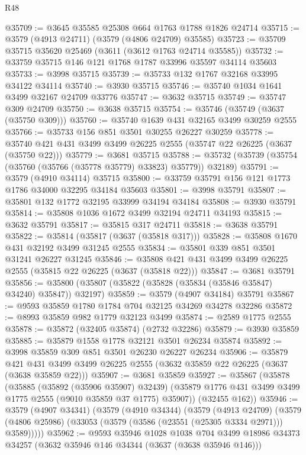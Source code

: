 \begin{lexlean}{R48}
\begin{coremodule}
@35709 := @3645 @35585 @25308 @664 @1763 @1788 @1826 @24714
@35715 := @3579 (@4913 @24711) (@3579 (@4806 @24709) @35585)
@35723 := @35709 @35715 @35620 @25469 (@3611 (@3612 @1763 @24714 @35585))
@35732 := @33759 @35715 @146 @121 @1768 @1787 @33996 @35597 @34114 @35603
@35733 := @3998 @35715
@35739 := @35733 @132 @1767 @32168 @33995 @34122 @34114
@35740 := @3930 @35715
@35746 := @35740 @1034 @1641 @3499 @32167 @24709 @33776
@35747 := @3632 @35715
@35749 := @35747 @309 @24709
@35750 := @3638 @35715
@35754 := @35746 (@35749 (@3637 (@35750 @309)))
@35760 := @35740 @1639 @431 @32165 @3499 @30259 @2555
@35766 := @35733 @156 @851 @3501 @30255 @26227 @30259
@35778 := @35740 @421 @431 @3499 @3499 @26225 @2555 (@35747 @22 @26225 (@3637 (@35750 @22)))
@35779 := @3681 @35715
@35788 := @35732 (@35739 (@35754 (@35760 (@35766 (@35778 @35779) @33823) @35779)) @32189)
@35791 := @3579 (@4910 @34114) @35715
@35800 := @33759 @35791 @156 @121 @1773 @1786 @34000 @32295 @34184 @35603
@35801 := @3998 @35791
@35807 := @35801 @132 @1772 @32195 @33999 @34194 @34184
@35808 := @3930 @35791
@35814 := @35808 @1036 @1672 @3499 @32194 @24711 @34193
@35815 := @3632 @35791
@35817 := @35815 @317 @24711
@35818 := @3638 @35791
@35822 := @35814 (@35817 (@3637 (@35818 @317)))
@35828 := @35808 @1670 @431 @32192 @3499 @31245 @2555
@35834 := @35801 @339 @851 @3501 @31241 @26227 @31245
@35846 := @35808 @421 @431 @3499 @3499 @26225 @2555 (@35815 @22 @26225 (@3637 (@35818 @22)))
@35847 := @3681 @35791
@35856 := @35800 (@35807 (@35822 (@35828 (@35834 (@35846 @35847) @34240) @35847)) @32197)
@35859 := @3579 (@4907 @34184) @35791
@35867 := @9593 @35859 @1780 @1784 @704 @32125 @34269 @34278 @32286
@35872 := @8993 @35859 @982 @1779 @32123 @3499
@35874 := @2589 @1775 @2555
@35878 := @35872 (@32405 @35874) (@2732 @32286)
@35879 := @3930 @35859
@35885 := @35879 @1558 @1778 @32121 @3501 @26234 @35874
@35892 := @3998 @35859 @309 @851 @3501 @26230 @26227 @26234
@35906 := @35879
    @421
    @431
    @3499
    @3499
    @26225
    @2555
    (@3632 @35859 @22 @26225 (@3637 (@3638 @35859 @22)))
@35907 := @3681 @35859
@35927 := @35867
    (@35878
      (@35885
        (@35892 (@35906 @35907) @32439)
        (@35879 @1776 @431 @3499 @3499 @1775 @2555 (@9010 @35859 @37 @1775) @35907))
      (@32455 @162))
@35946 := @3579
    (@4907 @34341)
    (@3579
      (@4910 @34344)
      (@3579
        (@4913 @24709)
        (@3579 (@4806 @25986) (@33053 (@3579 (@3586 (@23551 (@25305 @3334 @2971))) @3589)))))
@35962 := @9593
    @35946
    @1028
    @1038
    @704
    @3499
    @18986
    @34373
    @34257
    (@3632 @35946 @146 @34344 (@3637 (@3638 @35946 @146)))

\end{coremodule}
\end{lexlean}
